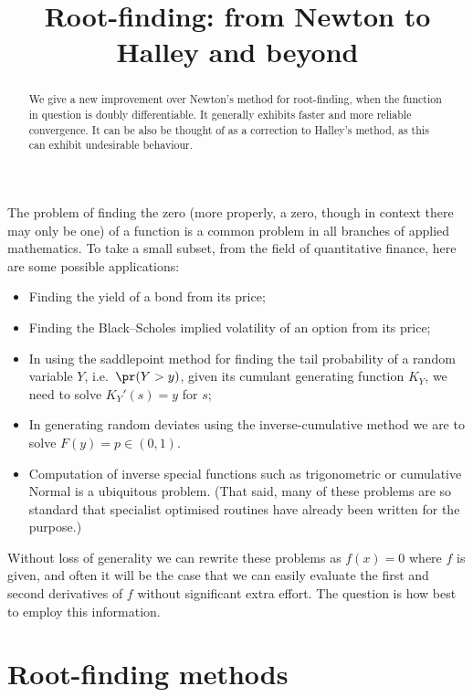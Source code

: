 
\title{\bf Root-finding: from Newton to Halley and beyond}
\maketitle

\begin{abstract}

We give a new improvement over Newton's method for root-finding, when the function in question is doubly differentiable. It generally exhibits faster and more reliable convergence. It can be also be thought of as a correction to Halley's method, as this can exhibit undesirable behaviour. 

\end{abstract}


The problem of finding the zero (more properly, a zero, though in context there may only be one) of a function is a common problem in all branches of applied mathematics.
To take a small subset, from the field of quantitative finance, here are some possible applications:
\begin{itemize}
\item
Finding the yield of a bond from its price;
\item
Finding the Black--Scholes implied volatility of an option from its price;
\item
In using the saddlepoint method \cite{Martin11b} for finding the tail probability of a random variable $Y$, i.e.\ $\pr(Y>y)$, given its cumulant generating function $K_Y$, we need to solve $K_Y'(s)=y$ for $s$;
\item
In generating random deviates using the inverse-cumulative method \cite[\S7.2]{NRC} we are to solve $F(y)=p\in(0,1)$.
\item
Computation of inverse special functions such as trigonometric or cumulative Normal is a ubiquitous problem. (That said, many of these problems are so standard that specialist optimised routines have already been written for the purpose.)
\end{itemize}
Without loss of generality we can rewrite these problems as $f(x)=0$ where $f$ is given, and often it will be the case that we can easily evaluate the first and second derivatives of $f$ without significant extra effort. The question is how best to employ this information.



\section{Root-finding methods}

